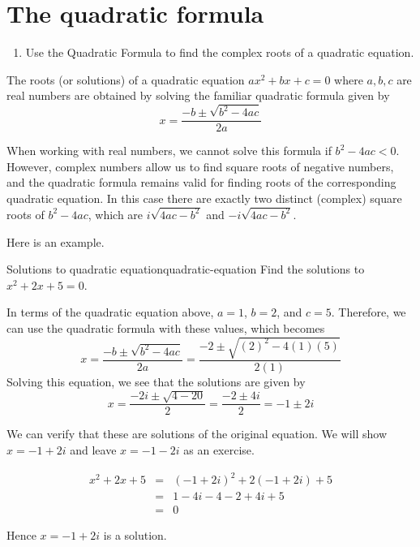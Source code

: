 \section{The quadratic formula}

\begin{outcome}
  \begin{enumerate}
  \item Use the Quadratic Formula to find the complex roots of a
    quadratic equation.
  \end{enumerate}
\end{outcome}

The roots (or solutions) of a quadratic equation $ax^{2}+bx+c=0$ where $a,b,c$ are real numbers are
obtained by solving the familiar quadratic formula
given by 
\begin{equation*}
x=
\frac{-b\pm \sqrt{b^{2}-4ac}}{2a}
\end{equation*}

When working with real numbers, we cannot solve this formula if
$b^{2}-4ac<0$. However, complex numbers allow us to find square roots
of negative numbers, and the quadratic formula remains valid for
finding roots of the corresponding quadratic equation.   In this case
there are exactly two distinct (complex) square roots of $b^{2}-4ac$, which are 
$i\sqrt{4ac-b^{2}}$ and $-i\sqrt{4ac-b^{2}}$.

Here is an example. 

\begin{example}{Solutions to quadratic equation}{quadratic-equation}
Find the solutions to $x^{2}+2x+5=0$.
\end{example}

\begin{solution}
In terms of the quadratic equation above, $a=1$, $b=2$, and $c=5$.
Therefore, we can use the quadratic formula with these values, which becomes
\begin{equation*}
x=
\frac{-b\pm \sqrt{b^{2}-4ac}}{2a}
= 
\frac{-2 \pm \sqrt{(2)^{2} - 4 (1)(5)}}{2(1)}
\end{equation*}
Solving this equation, we see that the solutions are given by
\begin{equation*}
x=\frac{-2i\pm \sqrt{4-20}}{2}=\frac{-2\pm 4i}{2}=-1\pm 2i
\end{equation*}

We can verify that these are solutions of the original equation. 
We will show $x = -1+2i$ and leave $x = -1-2i$ as an exercise.

\begin{eqnarray*}
x^{2}+2x+5
&=& (-1+2i)^2 + 2(-1+2i) + 5 \\
&=& 1 - 4i - 4 -2 + 4i + 5 \\
&=& 0
\end{eqnarray*}

Hence $x = -1+2i$ is a solution. 
\end{solution}

